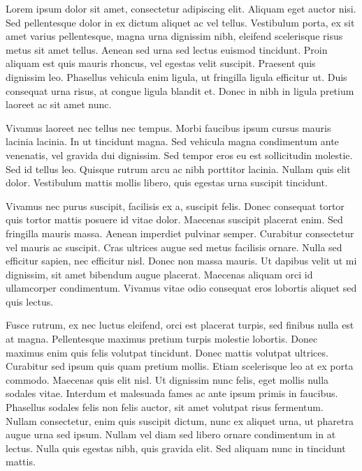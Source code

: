 \documentclass[12pt,a4paper,sans]{moderncv} %
\date{Monday, January 01st, 2024}
\begin{document}
\makelettertitle

\justifying

Lorem ipsum dolor sit amet, consectetur adipiscing elit. Aliquam eget auctor nisi. Sed pellentesque dolor in ex dictum aliquet ac vel tellus. Vestibulum porta, ex sit amet varius pellentesque, magna urna dignissim nibh, eleifend scelerisque risus metus sit amet tellus. Aenean sed urna sed lectus euismod tincidunt. Proin aliquam est quis mauris rhoncus, vel egestas velit suscipit. Praesent quis dignissim leo. Phasellus vehicula enim ligula, ut fringilla ligula efficitur ut. Duis consequat urna risus, at congue ligula blandit et. Donec in nibh in ligula pretium laoreet ac sit amet nunc.

Vivamus laoreet nec tellus nec tempus. Morbi faucibus ipsum cursus mauris lacinia lacinia. In ut tincidunt magna. Sed vehicula magna condimentum ante venenatis, vel gravida dui dignissim. Sed tempor eros eu est sollicitudin molestie. Sed id tellus leo. Quisque rutrum arcu ac nibh porttitor lacinia. Nullam quis elit dolor. Vestibulum mattis mollis libero, quis egestas urna suscipit tincidunt.

Vivamus nec purus suscipit, facilisis ex a, suscipit felis. Donec consequat tortor quis tortor mattis posuere id vitae dolor. Maecenas suscipit placerat enim. Sed fringilla mauris massa. Aenean imperdiet pulvinar semper. Curabitur consectetur vel mauris ac suscipit. Cras ultrices augue sed metus facilisis ornare. Nulla sed efficitur sapien, nec efficitur nisl. Donec non massa mauris. Ut dapibus velit ut mi dignissim, sit amet bibendum augue placerat. Maecenas aliquam orci id ullamcorper condimentum. Vivamus vitae odio consequat eros lobortis aliquet sed quis lectus.

Fusce rutrum, ex nec luctus eleifend, orci est placerat turpis, sed finibus nulla est at magna. Pellentesque maximus pretium turpis molestie lobortis. Donec maximus enim quis felis volutpat tincidunt. Donec mattis volutpat ultrices. Curabitur sed ipsum quis quam pretium mollis. Etiam scelerisque leo at ex porta commodo. Maecenas quis elit nisl. Ut dignissim nunc felis, eget mollis nulla sodales vitae. Interdum et malesuada fames ac ante ipsum primis in faucibus. Phasellus sodales felis non felis auctor, sit amet volutpat risus fermentum. Nullam consectetur, enim quis suscipit dictum, nunc ex aliquet urna, ut pharetra augue urna sed ipsum. Nullam vel diam sed libero ornare condimentum in at lectus. Nulla quis egestas nibh, quis gravida elit. Sed aliquam nunc in tincidunt mattis.

\makeletterclosing
\end{document}
